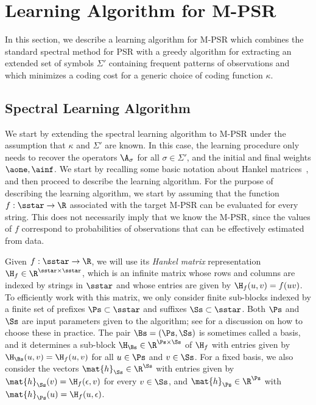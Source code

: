 \section{Learning Algorithm for M-PSR}

In this section, we describe a learning algorithm for M-PSR which combines the standard spectral method for PSR \cite{bootspsr} with a greedy algorithm for extracting an extended set of symbols $\Sigma'$ containing frequent patterns of observations and which minimizes a coding cost for a generic choice of coding function $\kappa$.

\subsection{Spectral Learning Algorithm}

We start by extending the spectral learning algorithm to M-PSR under the assumption that $\kappa$ and $\Sigma'$ are known. In this case, the learning procedure only needs to recover the operators $\A_\sigma$ for all $\sigma \in \Sigma'$, and the initial and final weights $\aone, \ainf$. We start by recalling some basic notation about Hankel matrices~\cite{CarlylePaz71,Fliess74}, and then proceed to describe the learning algorithm. For the purpose of describing the learning algorithm, we start by assuming that the function $f : \sstar \to \R$ associated with the target M-PSR can be evaluated for every string. This does not necessarily imply that we know the M-PSR, since the values of $f$ correspond to probabilities of observations that can be effectively estimated from data. 

Given $f : \sstar \to \R$, we will use its \emph{Hankel matrix} representation $\H_f \in \R^{\sstar \times \sstar}$, which is an infinite matrix whose rows and columns are indexed by strings in $\sstar$ and whose entries are given by $\H_f(u,v) = f(u v)$. To efficiently work with this matrix, we only consider finite sub-blocks indexed by a finite set of prefixes $\Ps \subset \sstar$ and suffixes $\Ss \subset \sstar$. Both $\Ps$ and $\Ss$ are input parameters given to the algorithm; see \cite{icml12} for a discussion on how to choose these in practice. The pair $\Bs = (\Ps,\Ss)$ is sometimes called a basis, and it determines a sub-block $\H_\Bs \in \R^{\Ps \times \Ss}$ of $\H_f$ with entries given by $\H_\Bs(u,v) = \H_f(u,v)$ for all $u \in \Ps$ and $v \in \Ss$. For a fixed basis, we also consider the vectors $\mat{h}_{\Ss} \in \R^{\Ss}$ with entries given by $\mat{h}_{\Ss}(v) = \H_f(\epsilon,v)$ for every $v \in \Ss$, and $\mat{h}_{\Ps} \in \R^{\Ps}$ with $\mat{h}_{\Ps}(u) = \H_f(u,\epsilon)$.

